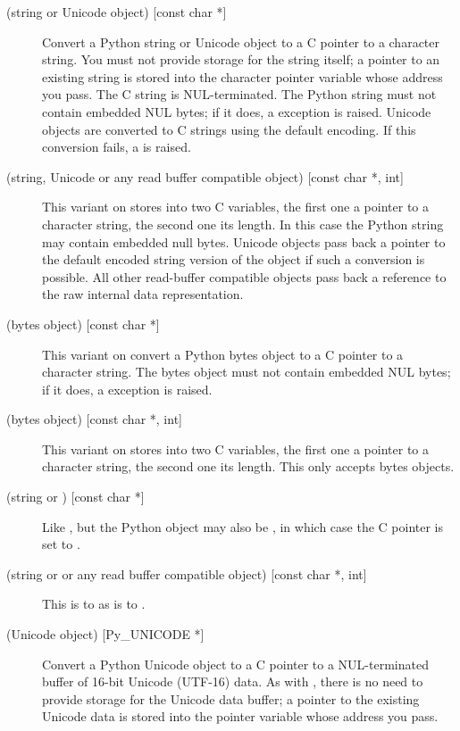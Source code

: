 \begin{description}
  \item[ (string or Unicode object) {[const char *]}]
  Convert a Python string or Unicode object to a C pointer to a
  character string.  You must not provide storage for the string
  itself; a pointer to an existing string is stored into the character
  pointer variable whose address you pass.  The C string is
  NUL-terminated.  The Python string must not contain embedded NUL
  bytes; if it does, a  exception is raised.
  Unicode objects are converted to C strings using the default
  encoding.  If this conversion fails, a  is
  raised.

  \item[ (string, Unicode or any read buffer compatible object)
  {[const char *, int]}]
  This variant on  stores into two C variables, the first one
  a pointer to a character string, the second one its length.  In this
  case the Python string may contain embedded null bytes.  Unicode
  objects pass back a pointer to the default encoded string version of
  the object if such a conversion is possible.  All other read-buffer
  compatible objects pass back a reference to the raw internal data
  representation.

  \item[ (bytes object)
  {[const char *]}]
  This variant on  convert a Python bytes object to a C pointer to a
  character string. The bytes object must not contain embedded NUL bytes;
  if it does, a  exception is raised.

  \item[ (bytes object)
  {[const char *, int]}]
  This variant on  stores into two C variables, the first one
  a pointer to a character string, the second one its length.  This only
  accepts bytes objects.

  \item[ (string or ) {[const char *]}]
  Like , but the Python object may also be , in
  which case the C pointer is set to \NULL.

  \item[ (string or  or any read buffer
  compatible object) {[const char *, int]}]
  This is to  as  is to .

  \item[ (Unicode object) {[Py_UNICODE *]}]
  Convert a Python Unicode object to a C pointer to a NUL-terminated
  buffer of 16-bit Unicode (UTF-16) data.  As with , there is
  no need to provide storage for the Unicode data buffer; a pointer to
  the existing Unicode data is stored into the 
  pointer variable whose address you pass.


\end{description}
